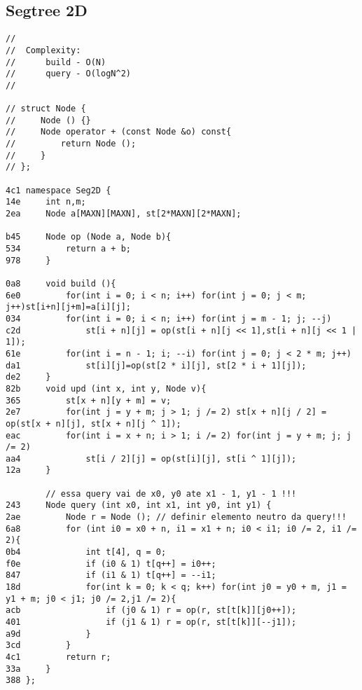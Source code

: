 \documentclass[11pt, a4paper, twoside]{article}
\begin{document}
\subsection{ Segtree 2D}
\begin{lstlisting}
//
//  Complexity:
//      build - O(N)
//      query - O(logN^2)
//  

// struct Node {
//     Node () {}
//     Node operator + (const Node &o) const{
//         return Node ();
//     }
// };

4c1 namespace Seg2D {
14e     int n,m;
2ea     Node a[MAXN][MAXN], st[2*MAXN][2*MAXN];
    
b45     Node op (Node a, Node b){
534         return a + b;
978     }
    
0a8     void build (){
6e0         for(int i = 0; i < n; i++) for(int j = 0; j < m; j++)st[i+n][j+m]=a[i][j];
034         for(int i = 0; i < n; i++) for(int j = m - 1; j; --j)
c2d             st[i + n][j] = op(st[i + n][j << 1],st[i + n][j << 1 | 1]);
61e         for(int i = n - 1; i; --i) for(int j = 0; j < 2 * m; j++)
da1             st[i][j]=op(st[2 * i][j], st[2 * i + 1][j]);
de2     }
82b     void upd (int x, int y, Node v){
365         st[x + n][y + m] = v;
2e7         for(int j = y + m; j > 1; j /= 2) st[x + n][j / 2] = op(st[x + n][j], st[x + n][j ^ 1]);
eac         for(int i = x + n; i > 1; i /= 2) for(int j = y + m; j; j /= 2)
aa4             st[i / 2][j] = op(st[i][j], st[i ^ 1][j]);
12a     }
    
        // essa query vai de x0, y0 ate x1 - 1, y1 - 1 !!!
243     Node query (int x0, int x1, int y0, int y1) {
2ae         Node r = Node (); // definir elemento neutro da query!!!
6a8         for (int i0 = x0 + n, i1 = x1 + n; i0 < i1; i0 /= 2, i1 /= 2){
0b4             int t[4], q = 0;
f0e             if (i0 & 1) t[q++] = i0++;
847             if (i1 & 1) t[q++] = --i1;
18d             for(int k = 0; k < q; k++) for(int j0 = y0 + m, j1 = y1 + m; j0 < j1; j0 /= 2,j1 /= 2){
acb                 if (j0 & 1) r = op(r, st[t[k]][j0++]);
401                 if (j1 & 1) r = op(r, st[t[k]][--j1]);
a9d             }
3cd         }
4c1         return r;
33a     }
388 };
\end{lstlisting}
\end{document}
